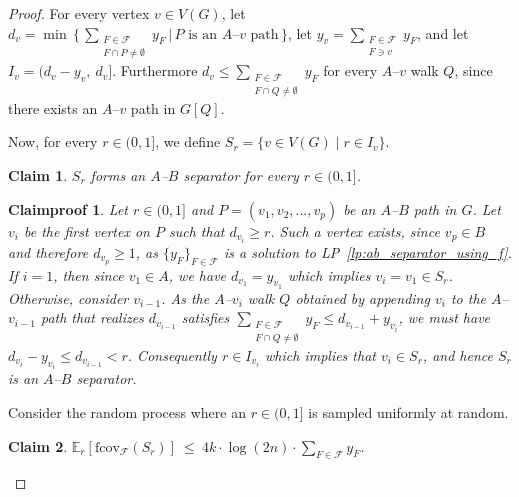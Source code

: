\documentclass[10pt,a4paper]{amsart}
\newtheorem{claim}{Claim}
\newtheorem{claimproof}{Claimproof}
\newcommand{\f}{\mathcal{F}}
\newcommand{\fcov}{\mathrm{fcov}_{\mathcal{F}}}
\begin{document}
\begin{proof}
    For every vertex $v \in V(G)$, let $d_v = \min\,\{\, \sum_{\substack{F \in \f \\ F \cap P \neq \emptyset}} y_F \,|\, P \text{ is an $A$--$v$ path} \,\}$, let $y_v = \sum_{\substack{F \in \f \\ F \ni v}} y_F$, and let $I_v = (d_v - y_v,\ d_v]$. 
    Furthermore $d_v \leq \sum_{\substack{F \in \f \\ F \cap Q \neq \emptyset}} y_F$ for every $A$--$v$ walk $Q$, since there exists an $A$--$v$ path in $G[Q]$. 

    Now, for every $r \in (0,1]$, we define $S_r = \{ v \in V(G) \mid r \in I_v \}$. 
    \begin{claim}\label{claim:S_r_is_A-B_sep}
        $S_r$ forms an $A$--$B$ separator for every $r\in (0,1]$.
    \end{claim}
    \begin{claimproof}
        Let $r\in (0,1]$ and $P = (v_1, v_2, \dots, v_p)$ be an $A$--$B$ path in $G$. Let $v_i$ be the first vertex on $P$ such that $d_{v_i} \geq r$. Such a vertex exists, since $v_p \in B$ and therefore $d_{v_p} \geq 1$, as $\{y_F\}_{F \in \f}$ is a solution to LP~\ref{lp:ab_separator_using_f}. If $i = 1$, then since $v_1 \in A$, we have $d_{v_1} = y_{v_1}$ which implies $v_i = v_1 \in S_r$. Otherwise, consider $v_{i-1}$. As the $A$--$v_i$ walk $Q$ obtained by appending $v_i$ to the $A$--$v_{i-1}$ path that realizes $d_{v_{i-1}}$ satisfies $\sum_{\substack{F \in \f \\ F \cap Q \neq \emptyset}} y_F \leq d_{v_{i-1}} + y_{v_i}$, we must have $d_{v_i} - y_{v_i} \leq d_{v_{i-1}} < r$. Consequently $r \in I_{v_i}$ which implies that $v_i \in S_r$, and hence $S_r$ is an $A$--$B$ separator.
    \end{claimproof}

    Consider the random process where an $r\in (0,1]$ is sampled uniformly at random.

    \begin{claim}\label{claim:S_r_has_small_cover}
        $\mathbb{E}_r[\fcov(S_r)]\ \leq\ 4k \cdot \log(2n) \cdot \sum_{F \in \f} y_F$.
    \end{claim}
    

\end{proof}
\end{document}
